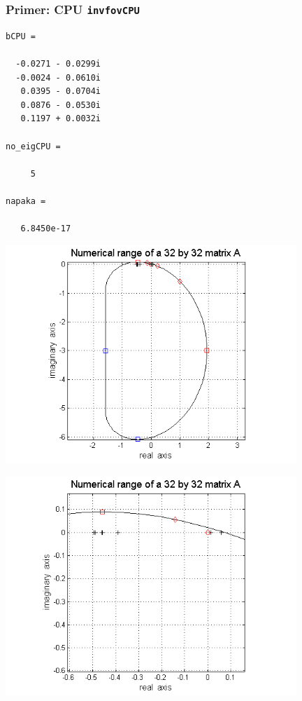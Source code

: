 \documentclass{beamer}
\begin{document}
\begin{frame}[fragile]
\frametitle{Primer: CPU \texttt{invfovCPU}}
\begin{verbatim}
bCPU =

  -0.0271 - 0.0299i
  -0.0024 - 0.0610i
   0.0395 - 0.0704i
   0.0876 - 0.0530i
   0.1197 + 0.0032i

no_eigCPU =

     5

napaka =

   6.8450e-17
\end{verbatim}
\end{frame}
\begin{frame}
\begin{center}
\includegraphics[width=11cm]{cpu1.png}
\end{center}
\end{frame}
\begin{frame}
\begin{center}
\includegraphics[width=11cm]{cpu2.png}
\end{center}
\end{frame}
\end{document}
